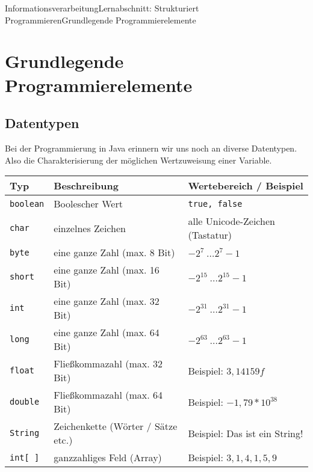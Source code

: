 \documentclass[11pt,oneside,openany,headings=optiontotoc,11pt,numbers=noenddot]{article}
\begin{document}
	\begin{worksheet}{Informationsverarbeitung}{Lernabschnitt: Strukturiert Programmieren}{Grundlegende Programmierelemente}
		\setlength{\columnseprule}{0pt}
		\setcounter{section}{4}
		\setcounter{page}{16}
		\section{Grundlegende Programmierelemente}
		\subsection{Datentypen}
		\label{datyp}
		Bei der Programmierung in Java erinnern wir uns noch an diverse Datentypen. Also die Charakterisierung der möglichen Wertzuweisung einer Variable.\\
		\par\noindent
		\begin{tabularx}{\textwidth}{lXX}
			\textbf{Typ} & \textbf{Beschreibung} & \textbf{Wertebereich / Beispiel}\\
			\hline
			\hline
			{\lstinline[style=Python]{boolean}} & Boolescher Wert & {\lstinline[style=Python]{true, false}}\\
			\hline
			{\lstinline[style=Python]{char}} & einzelnes Zeichen & alle Unicode-Zeichen (Tastatur)\\
			\hline
			{\lstinline[style=Python]{byte}} & eine ganze Zahl (max. 8 Bit) & \(-2^7\ \ldots 2^7-1\)\\
			\hdashline
			{\lstinline[style=Python]{short}} & eine ganze Zahl (max. 16 Bit) & \(-2^{15}\ \ldots 2^{15}-1\)\\
			\hdashline
			{\lstinline[style=Python]{int}} & eine ganze Zahl (max. 32 Bit) & \(-2^{31}\ \ldots 2^{31}-1\)\\
			\hdashline
			{\lstinline[style=Python]{long}} & eine ganze Zahl (max. 64 Bit) & \(-2^{63}\ \ldots 2^{63}-1\)\\
			\hline
			{\lstinline[style=Python]{float}} & Fließkommazahl (max. 32 Bit) & Beispiel: \(3,14159f\)\\
			\hdashline
			{\lstinline[style=Python]{double}} & Fließkommazahl (max. 64 Bit) & Beispiel: \(-1,79 * 10^{38}\)\\
			\hline
			{\lstinline[style=Python]{String}} & Zeichenkette (Wörter / Sätze etc.) & Beispiel: \glqq{}Das ist ein String!\grqq{}\\
			\hdashline
			{\lstinline[style=Python]{int[ ]}} & ganzzahliges Feld (Array) & Beispiel: \({3,1,4,1,5,9}\)\\

\end{tabularx}
\end{worksheet}
\end{document}
